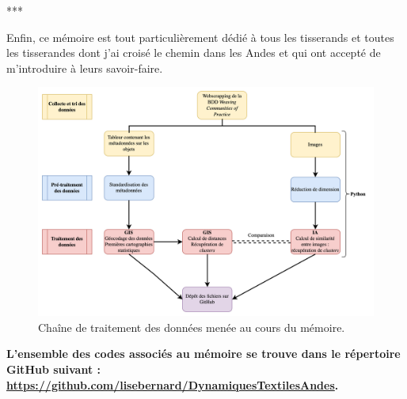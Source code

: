 \documentclass[a4paper, twoside]{book}
\begin{document}
\begin{center}
   ***
\end{center}

Enfin, ce mémoire est tout particulièrement dédié à tous les tisserands et toutes les tisserandes dont j'ai croisé le chemin dans les Andes et qui ont accepté de m'introduire à leurs savoir-faire.

\clearpage
\thispagestyle{empty}
\cleardoublepage

\renewcommand{\contentsname}{Sommaire}
\tableofcontents
\markboth{}{}{}

\clearpage

\mainmatter




\clearpage
\begin{figure}[!h]
	\begin{center}
		\includegraphics[width=17cm]{../images/pipelineM2.jpg}
           	 \caption{Chaîne de traitement des données menée au cours du mémoire.}
           	 \label{pipeline}
	 \end{center}
  \end{figure}

\vspace{10pt}

\textbf{L'ensemble des codes associés au mémoire se trouve dans le répertoire GitHub suivant : \url{https://github.com/lisebernard/DynamiquesTextilesAndes}.}






\listoffigures
\listoftables
\end{document}
